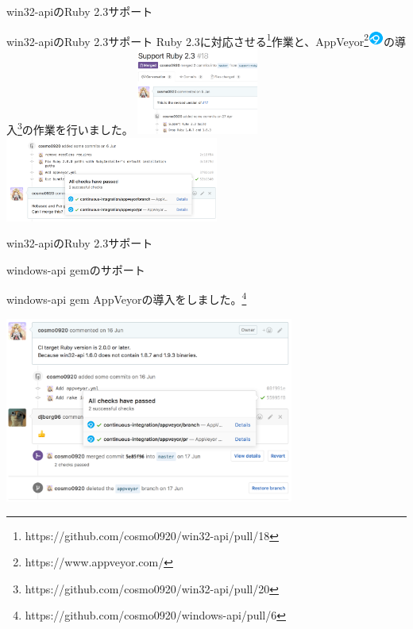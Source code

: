 \documentclass[12pt, unicode]{beamer}
\begin{document}
\begin{frame}{win32-apiのRuby 2.3サポート}
  \Large {
    \newline
    \small{}
  }
\end{frame}

\begin{frame}{win32-apiのRuby 2.3サポート}
  Ruby 2.3に対応させる\footnote[frame]{https://github.com/cosmo0920/win32-api/pull/18}作業と、AppVeyor\footnote[frame]{https://www.appveyor.com/}\includegraphics[clip,width=0.5cm]{images/appveyor_logo.png}の導入\footnote[frame]{https://github.com/cosmo0920/win32-api/pull/20}の作業を行いました。
  \includegraphics[clip,width=4cm]{images/support_ruby23_win32-api.png}
  \includegraphics[clip,width=7cm]{images/support_appveyor_win32-api.png}
\end{frame}

\begin{frame}{win32-apiのRuby 2.3サポート}
  \Large {
  }
\end{frame}

\begin{frame}{windows-api gemのサポート}
  \begin{block}{windows-api gem}
    AppVeyorの導入をしました。\footnote[frame]{https://github.com/cosmo0920/windows-api/pull/6}
  \end{block}
  \includegraphics[clip,width=9.5cm]{images/support_appveyor_windows-api_gem.png}
\end{frame}
\end{document}
